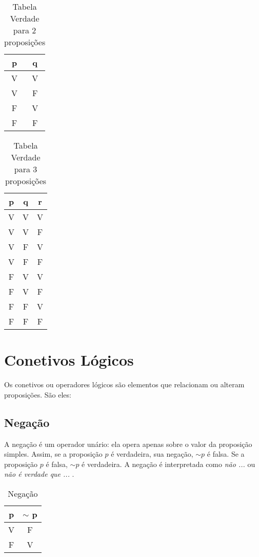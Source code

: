 \begin{table}[H]
\centering
\caption{Tabela Verdade para 2 proposições}
\label{2prop}
\begin{tabular}{c|c} 
\textbf{p} & \textbf{q} \\ \hline
V          & V          \\
V          & F          \\
F          & V          \\
F          & F         
\end{tabular}
\end{table}
\vspace{-0.5cm}
\begin{table}[H]
\centering
\caption{Tabela Verdade para 3 proposições}
\label{3prop}
\begin{tabular}{c|c|c}
\textbf{p}  & \textbf{q} &  \textbf{r} \\ \hline
V          & V          & V          \\
V          & V          & F          \\
V          & F          & V          \\
V          & F          & F          \\
F          & V          & V          \\
F          & V          & F          \\
F          & F          & V          \\
F          & F          & F         
\end{tabular}
\end{table}

\section{Conetivos Lógicos}
Os conetivos ou operadores lógicos são elementos que relacionam ou alteram proposições. São eles:
\subsection*{Negação}
A negação é um operador unário: ela opera apenas sobre o valor da proposição simples. Assim, se a proposição $p$ é verdadeira, sua negação, $\sim p$ é falsa. Se a proposição $p$ é falsa, $\sim p$ é verdadeira. A negação é interpretada como \textit{não ...} ou \textit{não é verdade que ...} .
\begin{table}[H]
\centering
\caption{Negação}
\label{not}
\begin{tabular}{c|c}
\textbf{p} & \textbf{$\sim$ p} \\ \hline
V          & F                 \\
F          & V                
\end{tabular}
\end{table}

